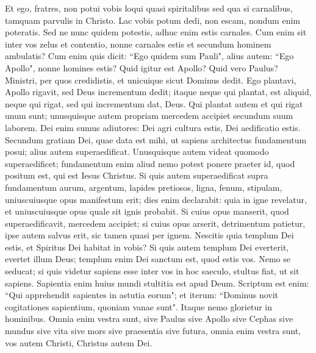 \begin{biblechapter} 
\verse Et ego, fratres, non potui vobis loqui quasi spiritalibus sed qua si carnalibus, tamquam parvulis in Christo. 
\verse Lac vobis potum dedi, non escam, nondum enim poteratis. Sed ne nunc quidem potestis, 
\verse adhuc enim estis carnales. Cum enim sit inter vos zelus et contentio, nonne carnales estis et secundum hominem ambulatis? 
\verse Cum enim quis dicit: “Ego quidem sum Pauli", alius autem: “Ego Apollo", nonne homines estis? 
\verse Quid igitur est Apollo? Quid vero Paulus? Ministri, per quos credidistis, et unicuique sicut Dominus dedit. 
\verse Ego plantavi, Apollo rigavit, sed Deus incrementum dedit; 
\verse itaque neque qui plantat, est aliquid, neque qui rigat, sed qui incrementum dat, Deus. 
\verse Qui plantat autem et qui rigat unum sunt; unusquisque autem propriam mercedem accipiet secundum suum laborem. 
\verse Dei enim sumus adiutores: Dei agri cultura estis, Dei aedificatio estis. 
\verse Secundum gratiam Dei, quae data est mihi, ut sapiens architectus fundamentum posui; alius autem superaedificat. Unusquisque autem videat quomodo superaedificet; 
\verse fundamentum enim aliud nemo potest ponere praeter id, quod positum est, qui est Iesus Christus. 
\verse Si quis autem superaedificat supra fundamentum aurum, argentum, lapides pretiosos, ligna, fenum, stipulam, 
\verse uniuscuiusque opus manifestum erit; dies enim declarabit: quia in igne revelatur, et uniuscuiusque opus quale sit ignis probabit. 
\verse Si cuius opus manserit, quod superaedificavit, mercedem accipiet; 
\verse si cuius opus arserit, detrimentum patietur, ipse autem salvus erit, sic tamen quasi per ignem. 
\verse Nescitis quia templum Dei estis, et Spiritus Dei habitat in vobis? 
\verse Si quis autem templum Dei everterit, evertet illum Deus; templum enim Dei sanctum est, quod estis vos. 
\verse Nemo se seducat; si quis videtur sapiens esse inter vos in hoc saeculo, stultus fiat, ut sit sapiens. 
\verse Sapientia enim huius mundi stultitia est apud Deum. Scriptum est enim: “Qui apprehendit sapientes in astutia eorum"; 
\verse et iterum: “Dominus novit cogitationes sapientium, quoniam vanae sunt". 
\verse Itaque nemo glorietur in hominibus. Omnia enim vestra sunt, 
\verse sive Paulus sive Apollo sive Cephas sive mundus sive vita sive mors sive praesentia sive futura, omnia enim vestra sunt, 
\verse vos autem Christi, Christus autem Dei. 
\end{biblechapter}


